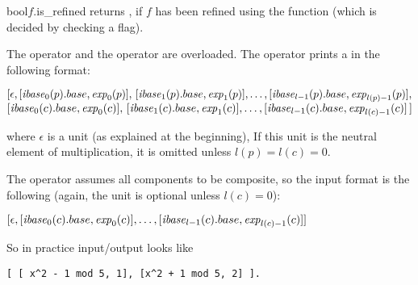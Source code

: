 
\begin{fcode}{bool}{$f$.is_refined}{}
  returns \TRUE, if $f$ has been refined using the function  (which is decided
  by checking a flag).
\end{fcode}




\IO

The  operator \code{>>} and the  operator\code{<<} are overloaded.
The  operator \code{<<} prints a  in the following
format:

\begin{center}
   $[ \epsilon , [\mathit{ibase}_0(p).base, \mathit{exp}_0(p)],\,
                         [\mathit{ibase}_1(p).base, \mathit{exp}_1(p)], \dots,
                         [\mathit{ibase}_{l-1}(p).base,\mathit{exp}_{l(p)-1}(p)],$\\
   $                [\mathit{ibase}_0(c).base, \mathit{exp}_0(c)],\,
                         [\mathit{ibase}_1(c).base, \mathit{exp}_1(c)],\dots,
                         [\mathit{ibase}_{l-1}(c).base, \mathit{exp}_{l(c)-1}(c)]\,]$
\end{center}

where $\epsilon$ is a unit (as explained at the beginning), If this unit is the neutral element
of multiplication, it is omitted unless $l(p) = l(c) = 0$.

The  operator \code{>>} assumes all components to be composite, so the input
format is the following (again, the unit is optional unless $l(c) = 0$):

\begin{center}
   $[ \epsilon , [\mathit{ibase}_0(c).base, \mathit{exp}_0(c)],
            \dots, [\mathit{ibase}_{l-1}(c).base, \mathit{exp}_{l(c)-1}(c) ] ]$
\end{center}

So in practice input/output looks like

\begin{verbatim}
[ [ x^2 - 1 mod 5, 1], [x^2 + 1 mod 5, 2] ].
\end{verbatim}



